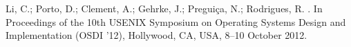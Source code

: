 \documentclass[algorithms,article,accept,moreauthors,pdftex,10pt,a4paper]{Definitions/mdpi}
\begin{document}
\begin{thebibliography}{999}
Li, C.; Porto, D.; Clement, A.; Gehrke, J.; Pregui{\c{c}}a, N.; Rodrigues, R.
.
\newblock In Proceedings of the 10th USENIX Symposium on Operating Systems Design and Implementation (OSDI ’12), Hollywood, CA, USA, 8--10 October 2012.

\end{thebibliography}
\end{document}
